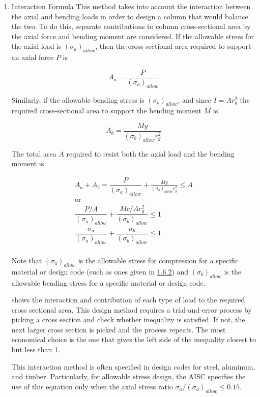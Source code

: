 \documentclass[a4paper,openany,12pt]{book}
\begin{document}
{{\begin{enumerate}
\item Interaction Formula
\label{sec:orgd43f240}
This method takes into account the interaction between the axial and
bending loads in order to design a column that would balance the two. To
do this, separate contributions to column cross-sectional area by the
axial force and bending moment are considered. If the allowable stress
for the axial load is \((\sigma_a)_{allow}\), then the cross-sectional
area required to support an axial force \(P\) is

$$A_a = \frac{P}{(\sigma_a)_{allow}}$$

Similarly, if the allowable bending stress is \((\sigma_b)_{allow}\), and
since \(I = Ar_g^2\) the required cross-sectional area to support the
bending moment \(M\) is

$$A_b = \frac{My}{(\sigma _b)_{allow}r_g^2}$$

The total area \(A\) required to resist both the axial load and the
bending moment is

$$\label{eqn: interaction formula}
  \begin{gathered}
    A_a + A_b = \dfrac{P}{(\sigma_a)_{allow}} + \frac{My}{(\sigma _b)_{allow}r_g^2} \leqslant A \\ 
    \text{or} \\ 
    \dfrac{P/A}{(\sigma_a)_{allow}} + \dfrac{Mc/Ar_g^2}{(\sigma_b)_{allow}} \leqslant 1 \\ 
    \dfrac{\sigma _a}{(\sigma_a)_{allow}} + \dfrac{\sigma_b}{(\sigma_b)_{allow}} \leqslant 1 \\ 
  \end{gathered}$$

Note that \((\sigma_a)_{allow}\) is the allowable stress for compression
for a specific material or design code (such as ones given in
\hyperref[sec:orgbe50252]{1.6.2}) and
\((\sigma_b)_{allow}\) is the allowable bending stress for a specific
material or design code.

shows the interaction and contribution of each type of load to the
required cross sectional area. This design method requires a
trial-and-error process by picking a cross section and check whether
inequality is satisfied. If not, the next larger cross section is picked
and the process repeats. The most economical choice is the one that
gives the left side of the inequality closest to but less than 1.

This interaction method is often specified in design codes for steel,
aluminum, and timber. Particularly, for allowable stress design, the
AISC specifies the use of this equation only when the axial stress ratio
\(\sigma_a / (\sigma_a)_{allow} \leq 0.15\).


\end{enumerate}}}
\end{document}
